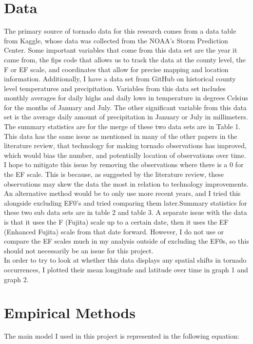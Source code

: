 \documentclass[12pt,english]{article}
\begin{document}
\section{Data}\label{sec:data}
The primary source of tornado data for this research comes from a data table from Kaggle\cite{Bryant2023}, whose data was collected from the NOAA's Storm Prediction Center. Some important variables that come from this data set are the year it came from, the fips code that allows us to track the data at the county level, the F or EF scale, and coordinates that allow for precise mapping and location information. Additionally, I have a data set from GitHub\cite{github} on historical county level temperatures and precipitation. Variables from this data set includes monthly averages for daily highs and daily lows in temperature in degrees Celsius for the months of January and July. The other significant variable from this data set is the average daily amount of precipitation in January or July in millimeters. The summary statistics are for the merge of these two data sets are in Table 1.
This data has the same issue as mentioned in many of the other papers in the literature review, that technology for making tornado observations has improved, which would bias the number, and potentially location of observations over time. I hope to mitigate this issue by removing the observations where there is a 0 for the EF scale. This is because, as suggested by the literature review, these observations may skew the data the most in relation to technology improvements. An alternative method would be to only use more recent years, and I tried this alongside excluding EF0's and tried comparing them later.Summary statistics for these two sub data sets are in table 2 and table 3. A separate issue with the data is that it uses the F (Fujita) scale up to a certain date, then it uses the EF (Enhanced Fujita) scale from that date forward. However, I do not use or compare the EF scales much in my analysis outside of excluding the EF0s, so this should not necessarily be an issue for this project.\\
In order to try to look at whether this data displays any spatial shifts in tornado occurrences, I plotted their mean longitude and latitude over time in graph 1 and graph 2. 



\section{Empirical Methods}\label{sec:methods}
The main model I used in this project is represented in the following equation:
\end{document}
